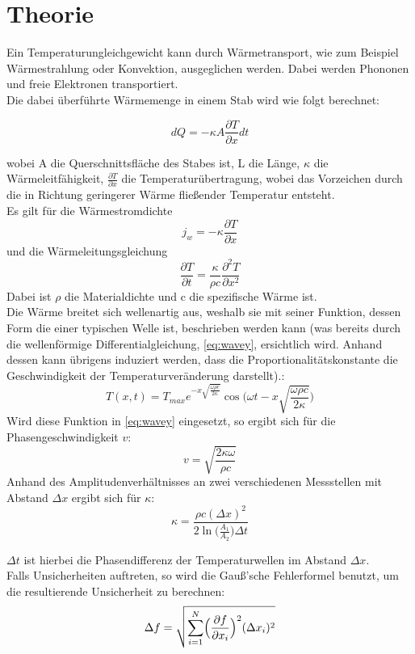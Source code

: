 \section{Theorie}
\label{sec:Theorie}

Ein Temperaturungleichgewicht kann durch Wärmetransport, wie zum Beispiel Wärmestrahlung oder Konvektion, ausgeglichen werden. Dabei werden Phononen und freie Elektronen transportiert.\\
Die dabei überführte Wärmemenge in einem Stab wird wie folgt berechnet:

\begin{equation}
    dQ = -\kappa A \frac{\partial T}{\partial x} dt
    \label{eq:warmcurrent}
\end{equation}

wobei A die Querschnittsfläche des Stabes ist, L die Länge, \(\kappa\) die Wärmeleitfähigkeit, \(\frac{\partial T}{\partial x}\) die Temperaturübertragung, wobei das Vorzeichen durch die in Richtung geringerer Wärme fließender Temperatur entsteht.\\
Es gilt für die Wärmestromdichte
\begin{equation}
    j_w = -\kappa\frac{\partial T}{\partial x}
    \label{eq:jw}
\end{equation}
und die Wärmeleitungsgleichung
\begin{equation}
    \frac{\partial T}{\partial t} = \frac{\kappa}{\rho c}\frac{\partial^2 T}{\partial x^2}
    \label{eq:wavey}
\end{equation}
Dabei ist \(\rho\) die Materialdichte und c die spezifische Wärme ist.\\
Die Wärme breitet sich wellenartig aus, weshalb sie mit seiner Funktion, dessen Form die einer typischen Welle ist, beschrieben werden kann (was bereits durch die wellenförmige Differentialgleichung, \autoref{eq:wavey}, ersichtlich wird. Anhand dessen kann übrigens induziert werden, dass die Proportionalitätskonstante die Geschwindigkeit der Temperaturveränderung darstellt).:
\begin{equation}
    T(x,t) = T_{max}e^{-x\sqrt{\frac{\omega \rho c}{2\kappa}}}\cos\biggl(\omega t-x\sqrt{\frac{\omega \rho c}{2\kappa}}\biggr) 
\end{equation}
Wird diese Funktion in \autoref{eq:wavey} eingesetzt, so ergibt sich für die Phasengeschwindigkeit \(v\):
\begin{equation}
    v = \sqrt{\frac{2\kappa \omega}{\rho c}}
\end{equation}
Anhand des Amplitudenverhältnisses an zwei verschiedenen Messstellen mit Abstand \(\Delta x\) ergibt sich für \(\kappa\):
\begin{equation}
    \kappa = \frac{\rho c (\Delta x)^2}{2\ln\biggl(\frac{A_1}{A_2}\biggr)\Delta t}
\end{equation}

\(\Delta t\) ist hierbei die Phasendifferenz der Temperaturwellen im Abstand \(\Delta x\).
\\
Falls Unsicherheiten auftreten, so wird die Gauß'sche Fehlerformel benutzt, um die resultierende Unsicherheit zu berechnen:
\begin{equation}
    \Delta f = \sqrt{\sum_{i=1}^N  \Bigl(\frac{\partial f}{\partial x_i}\Bigr)^2 (\Delta x_i)^2}
\end{equation}